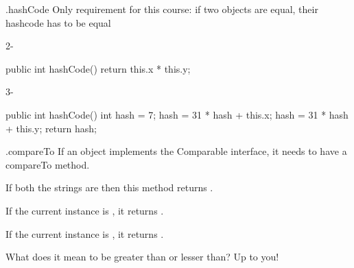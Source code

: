 \documentclass[week4]{csse2002}
\begin{document}
\begin{topic}{.hashCode}
Only requirement for this course: if two objects are equal, their
hashcode has to be equal

\begin{subtopic}{2-}
\begin{java}
public int hashCode() {
    return this.x * this.y;
}
\end{java}
\end{subtopic}

\begin{subtopic}{3-}
\begin{java}
public int hashCode() {
    int hash = 7;
    hash = 31 * hash + this.x;
    hash = 31 * hash + this.y;
    return hash;
}
\end{java}
\end{subtopic}
\end{topic}

\begin{topic}{.compareTo}
If an object implements the Comparable interface, it needs to have a
compareTo method.

If both the strings are  then this method returns .

If the current instance is , it returns .

If the current instance is , it returns .

What does it mean to be greater than or lesser than? Up to you!
\end{topic}
\end{document}
